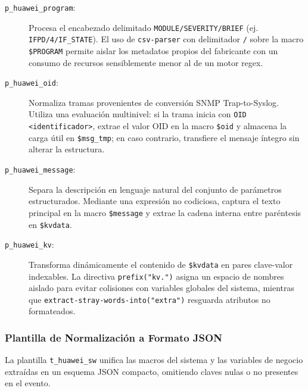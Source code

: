 \begin{description}
    \item[\texttt{p\_huawei\_program}:] Procesa el encabezado delimitado \texttt{MODULE/SEVERITY/BRIEF} (ej. \texttt{IFPD/4/IF\_STATE}). El uso de \texttt{csv-parser} con delimitador \texttt{/} sobre la macro \texttt{\${PROGRAM}} permite aislar los metadatos propios del fabricante con un consumo de recursos sensiblemente menor al de un motor regex.
    
    \item[\texttt{p\_huawei\_oid}:] Normaliza tramas provenientes de conversión SNMP Trap-to-Syslog. Utiliza una evaluación multinivel: si la trama inicia con \texttt{OID <identificador>}, extrae el valor OID en la macro \texttt{\${oid}} y almacena la carga útil en \texttt{\${msg\_tmp}}; en caso contrario, transfiere el mensaje íntegro sin alterar la estructura.
    
    \item[\texttt{p\_huawei\_message}:] Separa la descripción en lenguaje natural del conjunto de parámetros estructurados. Mediante una expresión no codiciosa, captura el texto principal en la macro \texttt{\${message}} y extrae la cadena interna entre paréntesis en \texttt{\${kvdata}}.
    
    \item[\texttt{p\_huawei\_kv}:] Transforma dinámicamente el contenido de \texttt{\${kvdata}} en pares clave-valor indexables. La directiva \texttt{prefix("kv.")} asigna un espacio de nombres aislado para evitar colisiones con variables globales del sistema, mientras que \texttt{extract-stray-words-into("extra")} resguarda atributos no formateados.
\end{description}

\subsubsection{Plantilla de Normalización a Formato JSON}

La plantilla \texttt{t\_huawei\_sw} unifica las macros del sistema y las variables de negocio extraídas en un esquema JSON compacto, omitiendo claves nulas o no presentes en el evento.

